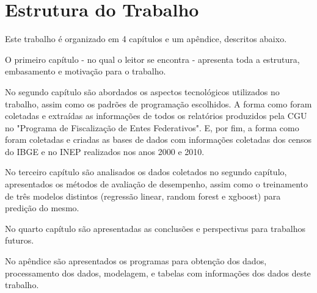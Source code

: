 \section{Estrutura do Trabalho}
\label{sec:estrutura_do_trabalho}

Este trabalho é organizado em 4 capítulos e um apêndice, descritos abaixo.

O primeiro capítulo - no qual o leitor se encontra - apresenta toda a estrutura, embasamento e motivação para o trabalho.

No segundo capítulo são abordados os aspectos tecnológicos utilizados no trabalho, assim como os padrões de programação escolhidos. A forma como foram coletadas e extraídas as informações de todos os relatórios produzidos pela CGU no "Programa de Fiscalização de Entes Federativos". E, por fim, a forma como foram coletadas e criadas as bases de dados com informações coletadas dos censos do IBGE e no INEP realizados nos anos 2000 e 2010.

No terceiro capítulo são analisados os dados coletados no segundo capítulo, apresentados os métodos de avaliação de desempenho, assim como o treinamento de três modelos distintos (regressão linear, random forest e xgboost) para predição do mesmo.

No quarto capítulo são apresentadas as conclusões e perspectivas para trabalhos futuros.

No apêndice são apresentados os programas para obtenção dos dados, processamento dos dados, modelagem, e tabelas com informações dos dados deste trabalho.

